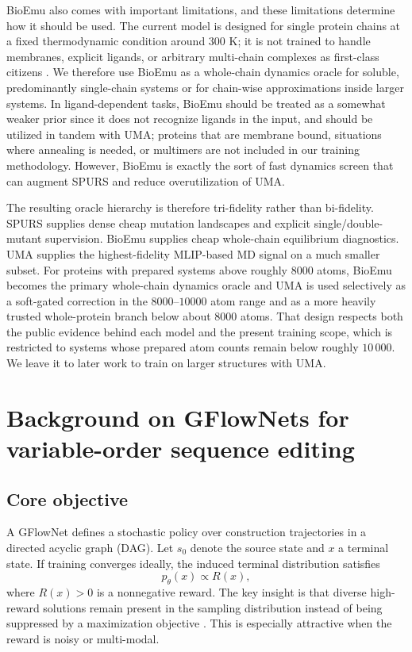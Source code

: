 \documentclass[11pt]{article}
\begin{document}
BioEmu also comes with important limitations, and these limitations determine how it should be used. The current model is designed for single protein chains at a fixed thermodynamic condition around $300$ K; it is not trained to handle membranes, explicit ligands, or arbitrary multi-chain complexes as first-class citizens \citep{lewis2024bioemu}. We therefore use BioEmu as a whole-chain dynamics oracle for soluble, predominantly single-chain systems or for chain-wise approximations inside larger systems. In ligand-dependent tasks, BioEmu should be treated as a somewhat weaker prior since it does not recognize ligands in the input, and should be utilized in tandem with UMA; proteins that are membrane bound, situations where annealing is needed, or multimers are not included in our training methodology. However, BioEmu is exactly the sort of fast dynamics screen that can augment SPURS and reduce overutilization of UMA.

The resulting oracle hierarchy is therefore tri-fidelity rather than bi-fidelity. SPURS supplies dense cheap mutation landscapes and explicit single/double-mutant supervision. BioEmu supplies cheap whole-chain equilibrium diagnostics. UMA supplies the highest-fidelity MLIP-based MD signal on a much smaller subset. For proteins with prepared systems above roughly $8000$ atoms, BioEmu becomes the primary whole-chain dynamics oracle and UMA is used selectively as a soft-gated correction in the $8000$--$10000$ atom range and as a more heavily trusted whole-protein branch below about $8000$ atoms. That design respects both the public evidence behind each model and the present training scope, which is restricted to systems whose prepared atom counts remain below roughly $10\,000$. We leave it to later work to train on larger structures with UMA. 


\section{Background on GFlowNets for variable-order sequence editing}
\label{sec:gfnbackground}

\subsection{Core objective}

A GFlowNet defines a stochastic policy over construction trajectories in a directed acyclic graph (DAG). Let $s_0$ denote the source state and $x$ a terminal state. If training converges ideally, the induced terminal distribution satisfies
\begin{equation}
    p_\theta(x) \propto R(x),
\end{equation}
where $R(x) > 0$ is a nonnegative reward. The key insight is that diverse high-reward solutions remain present in the sampling distribution instead of being suppressed by a maximization objective \citep{bengio2023gflownet}. This is especially attractive when the reward is noisy or multi-modal.
\end{document}
